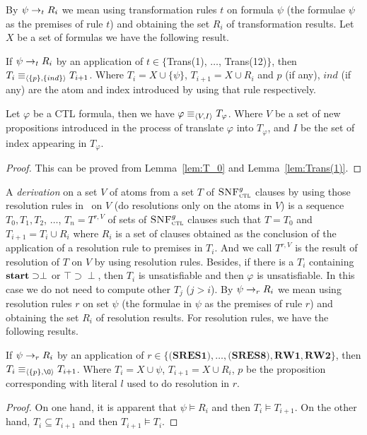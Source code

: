 \documentclass{article}
\begin{document}
By $\psi \rightarrow_t R_i$ we mean using transformation rules $t$ on formula $\psi$ (the formulae $\psi$ as the
premises of rule $t$) and obtaining the set  $R_i$ of transformation results. Let $X$ be a set of formulas
we have the following result.
\begin{lemma}\label{lem:Trans(1)}
If $\psi \rightarrow_t R_i$ by an application of $t\in \{$Trans(1), $\dots$, Trans(12)$\}$, then $T_i \equiv_{{\langle{\{p\}, \{ind\}}\rangle}} T_{i+1}$.
Where $T_i= X \cup \{\psi\}$, $T_{i+1}=X \cup R_i$ and $p$ (if any), $ind$ (if any) are the atom and index introduced by using that rule respectively.
\end{lemma}

\begin{proposition}\label{pro:Tran:VIB}
Let $\varphi$ be a CTL formula, then we have $\varphi \equiv_{{\langle{V, I}\rangle}} T_{\varphi}$.
Where $V$ be a set of new propositions introduced in the process of translate $\varphi$ into $T_{\varphi}$, and $I$ be the set of index appearing in $T_{\varphi}$.
\end{proposition}
\begin{proof}
This can be proved from Lemma~\ref{lem:T_0} and Lemma~\ref{lem:Trans(1)}.
\end{proof}





A \emph{derivation} on a set $V$ of atoms from a set $T$ of ${\textsc{SNF}_{\textsc{ctl}}^g}$ clauses by using those resolution rules in~\cite{zhang2009refined} on $V$ (\ie do resolutions only on the atoms in $V$) is a sequence $T_0, T_1, T_2$, $\dots$, $T_n=T^{r,V}$ of sets of ${\textsc{SNF}_{\textsc{ctl}}^g}$ clauses such that $T = T_0$ and $T_{i+1} = T_i \cup R_i$ where $R_i$ is a set of clauses obtained as the conclusion of the application of a resolution rule to premises in $T_i$. And we call $T^{r,V}$ is the result of resolution of $T$ on $V$ by using resolution rules.
Besides, if there is a $T_i$ containing $\textbf{start}\supset \perp$ or $\top\supset \perp$, then $T_i$ is unsatisfiable and then $\varphi$ is unsatisfiable. In this case we do not need to compute other $T_j$  ($j> i$).
By $\psi \rightarrow_r R_i$ we mean using resolution rules $r$ on set $\psi$ (the formulae in $\psi$ as the premises of rule $r$) and obtaining the set $R_i$ of resolution results. For resolution rules, we have the following results.

\begin{lemma}\label{lem:SRES}
If $\psi \rightarrow_r R_i$ by an application of $r\in \{\textbf{(SRES1)}, \dots, \textbf{(SRES8)}, \textbf{RW1}, \textbf{RW2}\}$,
then $T_i \equiv_{\tuple{\{p\}, {\O}}} T_{i+1}$.
Where $T_i= X \cup \psi$, $T_{i+1}=X \cup R_i$, $p$ be the proposition corresponding with literal $l$ used to do resolution in $r$.
\end{lemma}
\begin{proof}
On one hand, it is apparent that $\psi \models R_i$ and then $T_i \models T_{i+1}$. On the other hand, $T_i\subseteq T_{i+1}$ and then $T_{i+1} \models T_i$.
\end{proof}
\end{document}
